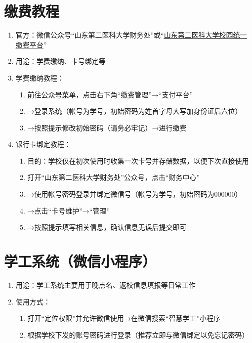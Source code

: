 \section[缴费教程]{缴费教程}
\label{fee_pay}
\begin{enumerate}
      \item 官方：微信公众号“山东第二医科大学财务处”或“\uline{\href{http://tyzfpt.wfmc.edu.cn/xysf/login.aspx}{山东第二医科大学校园统一缴费平台}}”
      \item 用途：学费缴纳、卡号绑定等
      \item 学费缴纳教程：
            \begin{enumerate}
                  \item 前往公众号菜单，点击右下角“缴费管理”→“支付平台”
                  \item →登录系统（帐号为学号，初始密码为姓首字母大写加身份证后六位）
                  \item →按照提示修改初始密码（请务必牢记）→进行缴费
            \end{enumerate}
      \item 银行卡绑定教程：
            \begin{enumerate}
                  \item 目的：学校仅在初次使用时收集一次卡号并存储数据，以便下次直接使用\footnotemark
                  \item 打开“山东第二医科大学财务处”公众号，点击“财务中心”
                  \item →使用帐号密码登录并绑定微信号（帐号为学号，初始密码为000000）
                  \item →点击“卡号维护”→“管理”
                  \item →按照提示填写相关信息，确认信息无误后提交即可
            \end{enumerate}
\end{enumerate}

\section[学工系统（微信小程序）]{学工系统（微信小程序）}
\begin{enumerate}
      \item 用途：学工系统主要用于晚点名、返校信息填报等日常工作\footnotemark
      \item 使用方式：
            \begin{enumerate}
                  \item 打开“定位权限”并允许微信使用→在微信搜索“智慧学工”小程序
                  \item 根据学校下发的账号密码进行登录（推荐立即与微信绑定以免忘记密码）
            \end{enumerate}
\end{enumerate}

